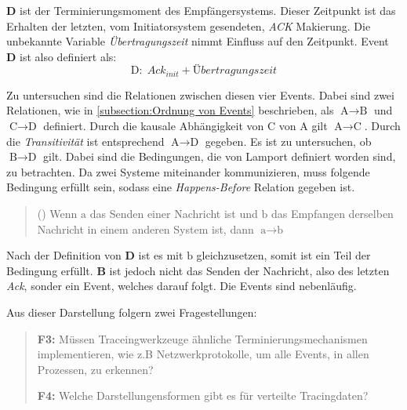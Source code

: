  \textbf{D} ist der Terminierungsmoment des Empfängersystems. Dieser Zeitpunkt ist das Erhalten der letzten, vom Initiatorsystem gesendeten, \emph{ACK} Makierung. Die unbekannte Variable \emph{Übertragungszeit} nimmt Einfluss auf den Zeitpunkt. Event \textbf{D} ist also definiert als:
 \[
 \text{D}: \; Ack_{init} + Übertragungszeit 
 \]
 
 Zu untersuchen sind die Relationen zwischen diesen vier Events.
 Dabei sind zwei Relationen, wie in \cref{subsection:Ordnung von Events} beschrieben, als $\text{A}\rightarrow\text{B}$ und $\text{C}\rightarrow\text{D}$ definiert. Durch die kausale Abhängigkeit von $\text{C}$ von $\text{A}$ gilt $\text{A}\rightarrow\text{C}$. Durch die \emph{Transitivität} ist entsprechend  $\text{A}\rightarrow\text{D}$ gegeben.  Es ist zu untersuchen, ob $\text{B}\rightarrow\text{D}$ gilt.
 Dabei sind die Bedingungen, die von Lamport definiert worden sind, zu betrachten. Da zwei Systeme miteinander kommunizieren, muss folgende Bedingung erfüllt sein, sodass eine \emph{Happens-Before} Relation gegeben ist. 
 \begin{quote}
 	() Wenn $\text{a}$ das Senden einer Nachricht ist und $\text{b}$ das Empfangen derselben Nachricht in einem anderen System ist, dann $\text{a}\rightarrow\text{b}$
 \end{quote}

Nach der Definition von \textbf{D} ist es mit $\text{b}$ gleichzusetzen, somit ist ein Teil der Bedingung erfüllt. \textbf{B} ist jedoch nicht das Senden der Nachricht, also des letzten \emph{Ack}, sonder ein Event, welches darauf folgt. Die Events sind nebenläufig. 


Aus dieser Darstellung folgern zwei Fragestellungen:
\begin{quote}
	\cbstart
	\textbf{F3:} Müssen Traceingwerkzeuge ähnliche Terminierungsmechanismen implementieren, wie z.B Netzwerkprotokolle, um alle Events, in allen Prozessen, zu erkennen?
	
	\textbf{F4:} Welche Darstellungensformen gibt es für verteilte Tracingdaten?
	\cbend
\end{quote}



